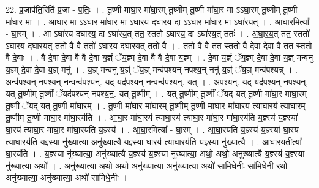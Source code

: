 \documentclass[17pt]{extarticle}
\begin{document}
22. प्र॒जाप॑ति॒रिति॑ प्र॒जा - प॒तिः॒ । . तू॒ष्णी मा॑घा॒र मा॑घा॒रम् तू॒ष्णीम् तू॒ष्णी मा॑घा॒र मा ऽऽघा॒रम् तू॒ष्णीम् तू॒ष्णी मा॑घा॒र मा । . आ॒घा॒र मा ऽऽघा॒र मा॑घा॒र मा ऽघा॑रय दघारय॒ दा ऽऽघा॒र मा॑घा॒र मा ऽघा॑रयत् । . आ॒घा॒रमित्या᳚ - घा॒रम् । . आ ऽघा॑रय दघारय॒ दा ऽघा॑रय॒त् तत॒ स्ततो॑ ऽघारय॒ दा ऽघा॑रय॒त् ततः॑ । . अ॒घा॒र॒य॒त् तत॒ स्ततो॑ ऽघारय दघारय॒त् ततो॒ वै वै ततो॑ ऽघारय दघारय॒त् ततो॒ वै । . ततो॒ वै वै तत॒ स्ततो॒ वै दे॒वा दे॒वा वै तत॒ स्ततो॒ वै दे॒वाः । . वै दे॒वा दे॒वा वै वै दे॒वा य॒ज्ञ्ं ॅय॒ज्ञ्म् दे॒वा वै वै दे॒वा य॒ज्ञ्म् । . दे॒वा य॒ज्ञ्ं ॅय॒ज्ञ्म् दे॒वा दे॒वा य॒ज्ञ् मन्वनु॑ य॒ज्ञ्म् दे॒वा दे॒वा य॒ज्ञ् मनु॑ । . य॒ज्ञ् मन्वनु॑ य॒ज्ञ्ं ॅय॒ज्ञ् मन्व॑पश्यन् नपश्य॒न् ननु॑ य॒ज्ञ्ं ॅय॒ज्ञ् मन्व॑पश्यन्न् । . अन्व॑पश्यन् नपश्य॒न् नन्वन्व॑पश्य॒न्॒. यद् यद॑पश्य॒न् नन्वन्व॑पश्य॒न्॒. यत् । . अ॒प॒श्य॒न्॒. यद् यद॑पश्यन् नपश्य॒न्॒. यत् तू॒ष्णीम् तू॒ष्णीं ॅयद॑पश्यन् नपश्य॒न्॒. यत् तू॒ष्णीम् । . यत् तू॒ष्णीम् तू॒ष्णीं ॅयद् यत् तू॒ष्णी मा॑घा॒र मा॑घा॒रम् तू॒ष्णीं ॅयद् यत् तू॒ष्णी मा॑घा॒रम् । . तू॒ष्णी मा॑घा॒र मा॑घा॒रम् तू॒ष्णीम् तू॒ष्णी मा॑घा॒र मा॑घा॒रय॑ त्याघा॒रय॑ त्याघा॒रम् तू॒ष्णीम् तू॒ष्णी मा॑घा॒र मा॑घा॒रय॑ति । . आ॒घा॒र मा॑घा॒रय॑ त्याघा॒रय॑ त्याघा॒र मा॑घा॒र मा॑घा॒रय॑ति य॒ज्ञ्स्य॑ य॒ज्ञ्स्या॑ घा॒रय॑ त्याघा॒र मा॑घा॒र मा॑घा॒रय॑ति य॒ज्ञ्स्य॑ । . आ॒घा॒रमित्या᳚ - घा॒रम् । . आ॒घा॒रय॑ति य॒ज्ञ्स्य॑ य॒ज्ञ्स्या॑ घा॒रय॑ त्याघा॒रय॑ति य॒ज्ञ्स्या नु॑ख्यात्या॒ अनु॑ख्यात्यै य॒ज्ञ्स्या॑ घा॒रय॑ त्याघा॒रय॑ति य॒ज्ञ्स्या नु॑ख्यात्यै । . आ॒घा॒रय॒तीत्या᳚ - घा॒रय॑ति । . य॒ज्ञ्स्या नु॑ख्यात्या॒ अनु॑ख्यात्यै य॒ज्ञ्स्य॑ य॒ज्ञ्स्या नु॑ख्यात्या॒ अथो॒ अथो॒ अनु॑ख्यात्यै य॒ज्ञ्स्य॑ य॒ज्ञ्स्या नु॑ख्यात्या॒ अथो᳚ । . अनु॑ख्यात्या॒ अथो॒ अथो॒ अनु॑ख्यात्या॒ अनु॑ख्यात्या॒ अथो॑ सामिधे॒नीः सा॑मिधे॒नी रथो॒ अनु॑ख्यात्या॒ अनु॑ख्यात्या॒ अथो॑ सामिधे॒नीः । \newline
\end{document}
